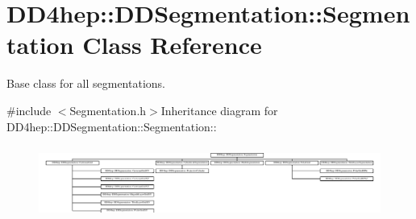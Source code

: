 \hypertarget{class_d_d4hep_1_1_d_d_segmentation_1_1_segmentation}{
\section{DD4hep::DDSegmentation::Segmentation Class Reference}
\label{class_d_d4hep_1_1_d_d_segmentation_1_1_segmentation}
}


Base class for all segmentations.  


{\ttfamily \#include $<$Segmentation.h$>$}Inheritance diagram for DD4hep::DDSegmentation::Segmentation::\begin{figure}[H]
\begin{center}
\leavevmode
\includegraphics[height=2.43214cm]{class_d_d4hep_1_1_d_d_segmentation_1_1_segmentation}
\end{center}
\end{figure}
